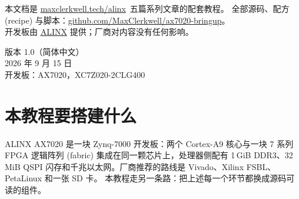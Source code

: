\documentclass[11pt,a4paper,oneside]{article}
\newcommand{\repo}{https://github.com/MaxClerkwell/ax7020-bringup}
\newcommand{\series}{\href{https://maxclerkwell.tech/alinx/}{maxclerkwell.tech/alinx}}
\begin{document}
\begin{titlepage}
\vfill
\begin{minipage}{0.56\textwidth}
\small\color{muted}
本文档是 \series\ 五篇系列文章的配套教程。
全部源码、配方 (recipe) 与脚本：\href{\repo}{github.com/MaxClerkwell/ax7020-bringup}。\\
开发板由 \href{https://www.alinx.com/}{ALINX} 提供；厂商对内容没有任何影响。
\end{minipage}
\hfill
\begin{minipage}{0.38\textwidth}
\raggedleft\small\color{muted}
版本 1.0（简体中文）\\
2026 年 9 月 15 日\\
开发板：AX7020，XC7Z020-2CLG400
\end{minipage}
\end{titlepage}

\tableofcontents
\clearpage

\section{本教程要搭建什么}

ALINX AX7020 是一块 Zynq-7000 开发板：两个 Cortex-A9 核心与一块 7 系列 FPGA
逻辑阵列 (fabric) 集成在同一颗芯片上，处理器侧配有 1\,GiB DDR3、32\,MiB QSPI
闪存和千兆以太网。厂商推荐的路线是 Vivado、Xilinx FSBL、PetaLinux 和一张 SD 卡。
本教程走另一条路：把上述每一个环节都换成源码可读的组件。
\end{document}
